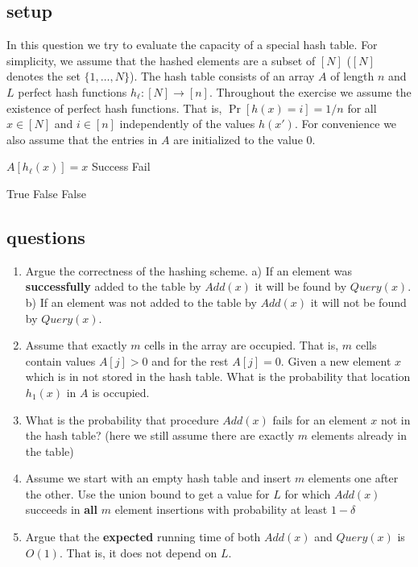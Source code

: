 \documentclass{article}
\begin{document}
\subsection*{setup}
In this question we try to evaluate the capacity of a special hash table.
For simplicity, we assume that the hashed elements are a subset of $[N]$ ($[N]$ denotes the set $\{1,\dots,N\}$).
The hash table consists of an array $A$ of length $n$ and $L$ perfect hash functions $h_\ell: [N] \rightarrow [n]$.
Throughout the exercise we assume the existence of perfect hash functions. That is, $\Pr[h(x) = i] = 1/n$ for all $x \in [N]$ and $i\in [n]$ 
independently of the values $h(x')$.  For convenience we also assume that the entries in $A$ are initialized to the value $0$.
%
\begin{algorithm}
\caption{$Add(x)$}
\begin{algorithmic}
\FOR {$\ell \in [L]$}
    	\STATE $A[h_\ell(x)] = x$
	\STATE \RETURN Success
    \ENDIF
\ENDFOR
\STATE \RETURN Fail
\end{algorithmic}
\end{algorithm}
%
\vspace{-.6cm}
\begin{algorithm}
\caption{$Query(x)$}
\begin{algorithmic}
\FOR {$\ell \in [L]$}
	\STATE \RETURN True
   	\STATE \RETURN False
    \ENDIF
\ENDFOR
\STATE \RETURN False
\end{algorithmic}
\end{algorithm}
%
\vspace{-.6cm}
\subsection*{questions}
\begin{enumerate}
\item Argue the correctness of the hashing scheme. 
a) If an element was {\bf successfully} added to the table by $Add(x)$ it will be found by $Query(x)$. 
b) If an element was not added to the table by $Add(x)$ it will not be found by $Query(x)$. 
\item Assume that exactly $m$ cells in the array are occupied. That is, $m$ cells contain values $A[j] > 0$ and for the rest $A[j]=0$.
Given a new element $x$ which is in not stored in the hash table. What is the probability that location $h_1(x)$ in $A$ is occupied.
\item What is the probability that procedure $Add(x)$ fails for an element $x$ not in the hash table? (here we still assume there are exactly $m$ elements already in the table)
\item Assume we start with an empty hash table and insert $m$ elements one after the other. 
Use the union bound to get a value for $L$ for which $Add(x)$ succeeds in {\bf all} $m$ element insertions with probability at least $1-\delta$
\item Argue that the {\bf expected} running time of both $Add(x)$ and $Query(x)$ is $O(1)$. That is, it does not depend on $L$. 
\end{enumerate}


\end{document}
